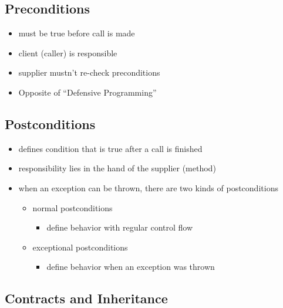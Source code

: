 \hypertarget{preconditions}{%
\subsection{Preconditions}\label{preconditions}}

\begin{itemize}
\tightlist
\item
  must be true before call is made
\item
  client (caller) is responsible
\item
  supplier mustn't re-check preconditions
\item
  Opposite of ``Defensive Programming''
\end{itemize}

\hypertarget{postconditions}{%
\subsection{Postconditions}\label{postconditions}}

\begin{itemize}
\tightlist
\item
  defines condition that is true after a call is finished
\item
  responsibility lies in the hand of the supplier (method)
\item
  when an exception can be thrown, there are two kinds of postconditions

  \begin{itemize}
  \tightlist
  \item
    normal postconditions

    \begin{itemize}
    \tightlist
    \item
      define behavior with regular control flow
    \end{itemize}
  \item
    exceptional postconditions

    \begin{itemize}
    \tightlist
    \item
      define behavior when an exception was thrown
    \end{itemize}
  \end{itemize}
\end{itemize}

\hypertarget{contracts-and-inheritance}{%
\subsection{Contracts and Inheritance}\label{contracts-and-inheritance}}

